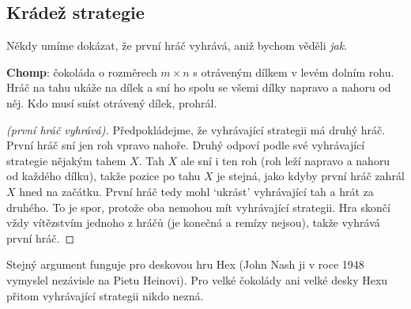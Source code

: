 \subsection{Krádež strategie}

Někdy umíme dokázat, že první hráč vyhrává, aniž bychom věděli \textit{jak}.

\begin{example}
  \textbf{Chomp}: čokoláda o rozměrech $m\times n$ s otráveným dílkem v levém dolním rohu. Hráč na tahu ukáže na dílek a sní ho spolu se všemi dílky napravo a nahoru od něj. Kdo musí sníst otrávený dílek, prohrál.
\end{example}

\begin{center}
\end{center}

\begin{proof}[(první hráč vyhrává)]
  Předpokládejme, že vyhrávající strategii má druhý hráč. První hráč sní jen roh vpravo nahoře. Druhý odpoví podle své vyhrávající strategie nějakým tahem $X$. Tah $X$ ale sní i ten roh (roh leží napravo a nahoru od každého dílku), takže pozice po tahu $X$ je stejná, jako kdyby první hráč zahrál $X$ hned na začátku. První hráč tedy mohl `ukrást' vyhrávající tah a hrát za druhého. To je spor, protože oba nemohou mít vyhrávající strategii. Hra skončí vždy vítězstvím jednoho z hráčů (je konečná a remízy nejsou), takže vyhrává první hráč.
\end{proof}

Stejný argument funguje pro deskovou hru Hex (John Nash ji v roce 1948 vymyslel nezávisle na Pietu Heinovi). Pro velké čokolády ani velké desky Hexu přitom vyhrávající strategii nikdo nezná.

